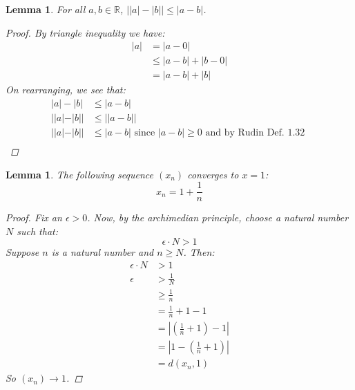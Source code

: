 \documentclass{amsart}
\newtheorem{lemma}[theorem]{Lemma}
\begin{document}
\begin{lemma}
    For all $a,b\in\mathbb{R}$, $\left| |a| - |b| \right| \leq |a - b|$.
    \begin{proof}
        By triangle inequality we have:
        \begin{align*}
            |a| &= |a - 0| \\
            &\leq |a - b| + |b - 0| \\
            &= |a - b| + |b| 
        \end{align*}
        On rearranging, we see that:
        \begin{align*}
            |a| - |b| &\leq |a - b| \\
            ||a| - |b|| &\leq ||a - b|| \\
            ||a| - |b|| &\leq |a - b| \text{ since } |a - b| \geq 0
            \text{ and by Rudin Def. 1.32 }\\
        \end{align*}
    \end{proof}
\end{lemma}
\begin{lemma} 
    The following sequence $(x_n)$ converges to $x = 1$:
    \[
        x_n = 1 + \frac{1}{n}    
    \]
    \begin{proof}
        Fix an $\epsilon > 0$. Now, by the archimedian principle, choose a natural number $N$ such that:
        \[
            \epsilon\cdot N > 1    
        \]
        Suppose $n$ is a natural number and $n \geq N$. Then:
        \begin{align*}
            \epsilon\cdot N &> 1 \\
            \epsilon &> \frac{1}{N} \\
            &\geq \frac{1}{n} \\
            &= \frac{1}{n} + 1 - 1 \\
            &= \left| \left(\frac{1}{n} + 1\right) - 1 \right| \\
            &= \left| 1 - \left(\frac{1}{n} + 1\right) \right| \\
            &= d(x_n, 1)
        \end{align*}
        So $(x_n) \to 1$.
    \end{proof}
\end{lemma}
\newpage
\end{document}
